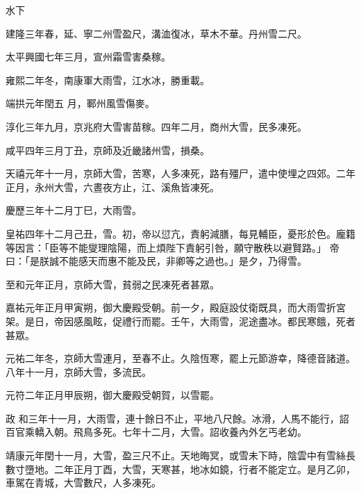 
\begin{pinyinscope}

 水下



 建隆三年春，延、寧二州雪盈尺，溝洫復冰，草木不華。丹州雪二尺。



 太平興國七年三月，宣州霜雪害桑稼。



 雍熙二年冬，南康軍大雨雪，江水冰，勝重載。



 端拱元年閏五
 月，鄆州風雪傷麥。



 淳化三年九月，京兆府大雪害苗稼。四年二月，商州大雪，民多凍死。



 咸平四年三月丁丑，京師及近畿諸州雪，損桑。



 天禧元年十一月，京師大雪，苦寒，人多凍死，路有殭尸，遣中使埋之四郊。二年正月，永州大雪，六晝夜方止，江、溪魚皆凍死。



 慶歷三年十二月丁巳，大雨雪。



 皇祐四年十二月己丑，雪。初，帝以愆亢，責躬減膳，每見輔臣，憂形於色。龐籍等因言：「臣等不能燮理陰陽，而上煩陛下責躬引咎，願守散秩以避賢路。」
 帝曰：「是朕誠不能感天而惠不能及民，非卿等之過也。」是夕，乃得雪。



 至和元年正月，京師大雪，貧弱之民凍死者甚眾。



 嘉祐元年正月甲寅朔，御大慶殿受朝。前一夕，殿庭設仗衛既具，而大雨雪折宮架。是日，帝因感風眩，促禮行而罷。壬午，大雨雪，泥途盡冰。都民寒餓，死者甚眾。



 元祐二年冬，京師大雪連月，至春不止。久陰恆寒，罷上元節游幸，降德音諸道。八年十一月，京師大雪，多流民。



 元符二年正月甲辰朔，御大慶殿受朝賀，以雪罷。



 政
 和三年十一月，大雨雪，連十餘日不止，平地八尺餘。冰滑，人馬不能行，詔百官乘轎入朝。飛鳥多死。七年十二月，大雪。詔收養內外乞丐老幼。



 靖康元年閏十一月，大雪，盈三尺不止。天地晦冥，或雪未下時，陰雲中有雪絲長數寸墮地。二年正月丁酉，大雪，天寒甚，地冰如鏡，行者不能定立。是月乙卯，車駕在青城，大雪數尺，人多凍死。




\end{pinyinscope}
